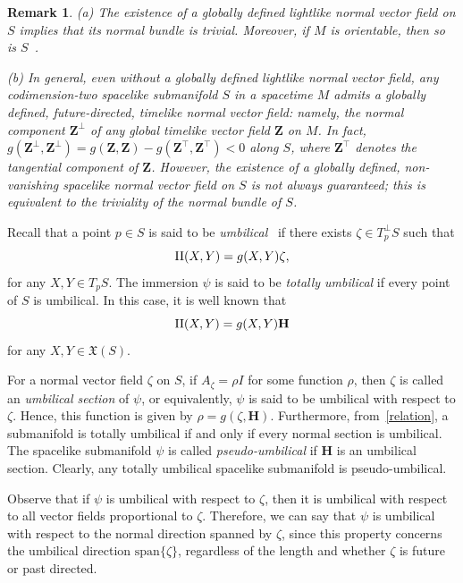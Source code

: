 \documentclass[11pt]{article}
\numberwithin{equation}{section}
\newtheorem{remark}[theorem]{Remark}
\begin{document}
	\begin{remark}\label{notaOrientable} \normalfont
		(a) The existence of a globally defined lightlike normal vector field on $S$ implies that its normal bundle is trivial. Moreover, if $M$ is orientable, then so is $S$~\cite[p.~214]{oneill}.
		
		(b) In general, even without a globally defined lightlike normal vector field, any codimension-two spacelike submanifold $S$ in a spacetime $M$ admits a globally defined, future-directed, timelike normal vector field: namely, the normal component $\mathbf{Z}^\perp$ of any global timelike vector field $\mathbf{Z}$ on $M$. In fact, $g(\mathbf{Z}^\perp, \mathbf{Z}^\perp) = g(\mathbf{Z}, \mathbf{Z}) - g(\mathbf{Z}^\top, \mathbf{Z}^\top) < 0$ along $S$, where $\mathbf{Z}^\top$ denotes the tangential component of $\mathbf{Z}$. However, the existence of a globally defined, non-vanishing spacelike normal vector field on $S$ is not always guaranteed; this is equivalent to the triviality of the normal bundle of $S$.
	\end{remark}
	
	
	
	Recall that a point $p \in S$ is said to be \emph{umbilical}~\cite{oneill} if there exists $\zeta \in T^{\perp}_p S$ such that
	\[
	{\rm II}(X, Y) = g(X, Y) \zeta,
	\]
	for any $X, Y \in T_p S$. The immersion $\psi$ is said to be \emph{totally umbilical} if every point of $S$ is umbilical. In this case, it is well known that
	\[
	{\rm II}(X, Y) = g(X, Y) \mathbf{H}
	\]
	for any $X, Y \in {\mathfrak X}(S)$.
	
	For a normal vector field $\zeta$ on $S$, if $A_\zeta = \rho I$ for some function $\rho$, then $\zeta$ is called an \emph{umbilical section} of $\psi$, or equivalently, $\psi$ is said to be umbilical with respect to $\zeta$. Hence, this function is given by $\rho = g(\zeta, \mathbf{H})$. Furthermore, from~\eqref{relation}, a submanifold is totally umbilical if and only if every normal section is umbilical. The spacelike submanifold $\psi$ is called \emph{pseudo-umbilical} if $\mathbf{H}$ is an umbilical section. Clearly, any totally umbilical spacelike submanifold is pseudo-umbilical.
	
	
	
	
	Observe that if $\psi$ is umbilical with respect to $\zeta$, then it is umbilical with respect to all vector fields proportional to $\zeta$. Therefore, we can say that $\psi$ is umbilical with respect to the normal direction spanned by $\zeta$, since this property concerns the umbilical direction $\mathrm{span}\{\zeta\}$, regardless of the length and whether $\zeta$ is future or past directed.
	
\end{document}
